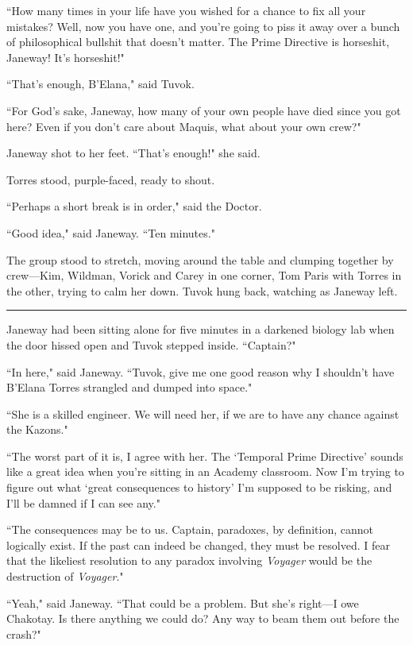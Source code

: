 \documentclass[twoside,letterpaper,12pt]{memoir}
\begin{document}
``How many times in your life have you wished for a chance to fix all your mistakes? Well, now you have one, and you're going to piss it away over a bunch of philosophical bullshit that doesn't matter. The Prime Directive is horseshit, Janeway! It’s horseshit!" 

``That's enough, B'Elana," said Tuvok. 

``For God's sake, Janeway, how many of your own people have died since you got here? Even if you don't care about Maquis, what about your own crew?" 

Janeway shot to her feet. ``That's enough!" she said. 

Torres stood, purple-faced, ready to shout. 

``Perhaps a short break is in order," said the Doctor. 

``Good idea," said Janeway. ``Ten minutes." 

The group stood to stretch, moving around the table and clumping together by crew---Kim, Wildman, Vorick and Carey in one corner, Tom Paris with Torres in the other, trying to calm her down. Tuvok hung back, watching as Janeway left. 

\begin{center}\rule{3cm}{0.4 pt}\end{center} 

Janeway had been sitting alone for five minutes in a darkened biology lab when the door hissed open and Tuvok stepped inside. ``Captain?" 

``In here," said Janeway. ``Tuvok, give me one good reason why I shouldn't have B'Elana Torres strangled and dumped into space." 

``She is a skilled engineer. We will need her, if we are to have any chance against the Kazons." 

``The worst part of it is, I agree with her. The `Temporal Prime Directive' sounds like a great idea when you're sitting in an Academy classroom. Now I'm trying to figure out what `great consequences to history' I'm supposed to be risking, and I'll be damned if I can see any." 

``The consequences may be to us. Captain, paradoxes, by definition, cannot logically exist. If the past can indeed be changed, they must be resolved. I fear that the likeliest resolution to any paradox involving \textit{Voyager} would be the destruction of \textit{Voyager}." 

``Yeah," said Janeway. ``That could be a problem. But she's right---I owe Chakotay. Is there anything we could do? Any way to beam them out before the crash?" 
\end{document}
